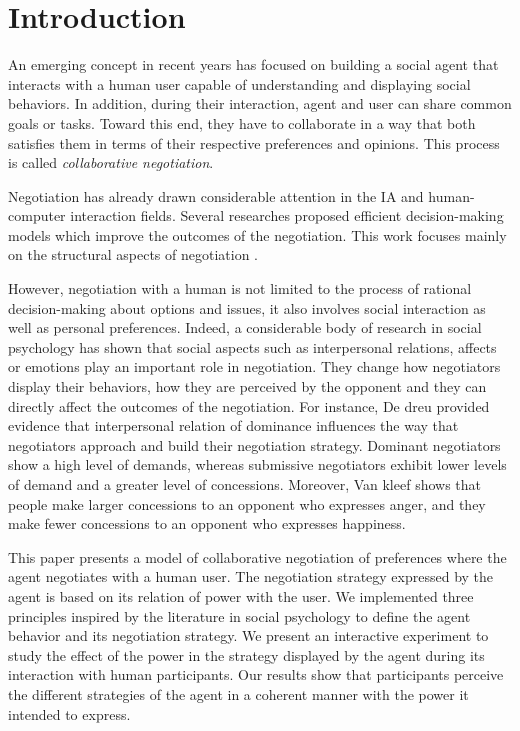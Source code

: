 \documentclass[runningheads,a4paper]{llncs}
\begin{document}
	
	\section{Introduction}
	An emerging concept in recent years has focused on building a social agent that interacts with a human user capable of understanding and displaying social behaviors. In addition, during their interaction, agent and user can share common goals or tasks. Toward this end, they have to collaborate in a way that both satisfies them in terms of their respective preferences and opinions. This process is called \emph{collaborative negotiation}.
	
	Negotiation has already drawn considerable attention in the IA and human-computer interaction fields. Several researches proposed efficient decision-making models which improve the outcomes of the negotiation. This work focuses mainly on the structural aspects of negotiation \cite{sycara2010agent,lai2009generic}. 
	
	However, negotiation with a human is not limited to the process of rational decision-making about options and issues, it also involves social interaction as well as personal preferences. Indeed, a considerable body of research in social psychology has shown that social aspects such as interpersonal relations, affects or emotions play an important role in negotiation. They change how negotiators display their behaviors, how they are perceived by the opponent and they can directly affect the outcomes of the negotiation.
	For instance, De dreu\cite{de1995impact} provided evidence that interpersonal relation of dominance influences the way that negotiators approach and build their negotiation strategy. Dominant negotiators show a high level of demands, whereas submissive negotiators exhibit lower levels of demand and a greater level of concessions. Moreover, Van kleef \cite{van2006power} shows that people make larger concessions to an opponent who expresses anger, and they make fewer concessions to an opponent who expresses happiness.
	
	This paper presents a model of collaborative negotiation of preferences where the agent negotiates with a human user. The negotiation strategy expressed by the agent is based on its relation of power with the user. We implemented three principles inspired by the literature in social psychology to define the agent behavior and its negotiation strategy. We present an interactive experiment to study the effect of the power in the strategy displayed by the agent during its interaction with human participants. Our results show that participants perceive the different strategies of the agent in a coherent manner with the power it intended to express. 
	
\end{document}
